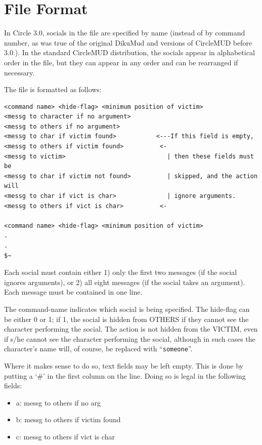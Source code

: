 \documentclass[11pt]{article}
\begin{document}
\section{File Format}
In Circle 3.0, socials in the file are specified by name (instead of by command number, as was true of the original DikuMud and versions of CircleMUD before 3.0.).  In the standard CircleMUD distribution, the socials appear in alphabetical order in the file, but they can appear in any order and can be rearranged if necessary.
\par
The file is formatted as follows:
\begin{verbatim}
<command name> <hide-flag> <minimum position of victim>
<messg to character if no argument>
<messg to others if no argument>
<messg to char if victim found>           <---If this field is empty,
<messg to others if victim found>          <- 
<messg to victim>                            | then these fields must be
<messg to char if victim not found>          | skipped, and the action will
<messg to char if vict is char>              | ignore arguments.
<messg to others if vict is char>          <-

<command name> <hide-flag> <minimum position of victim>
.
.
$~
\end{verbatim}
Each social must contain either 1) only the first two messages (if the social ignores arguments), or 2) all eight messages (if the social takes an argument). Each message must be contained in one line.
\par
The command-name indicates which social is being specified.  The hide-flag can be either 0 or 1; if 1, the social is hidden from OTHERS if they cannot see the character performing the social.  The action is not hidden from the VICTIM, even if s/he cannot see the character performing the social, although in such cases the character's name will, of course, be replaced with ``\texttt{someone}''.
\par
Where it makes sense to do so, text fields may be left empty. This is done by putting a `\#' in the first column on the line.  Doing so is legal in the following fields:
\begin{itemize}
\item a: messg to others if no arg
\item b: messg to others if victim found
\item c: messg to others if vict is char
\end{itemize}
\end{document}
